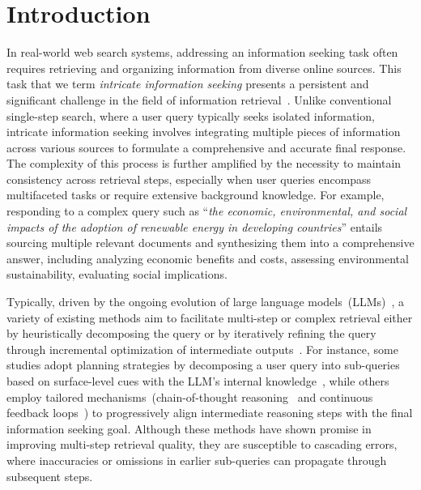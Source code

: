 \section{Introduction}

In real-world web search systems, addressing an information seeking task often requires retrieving and organizing information from diverse online sources. This task that we term \emph{intricate information seeking} presents a persistent and significant challenge in the field of information retrieval~\cite{strohman2005optimization, talmor2018web}. Unlike conventional single-step search, where a user query typically seeks isolated information, intricate information seeking involves integrating multiple pieces of information across various sources to formulate a comprehensive and accurate final response.
The complexity of this process is further amplified by the necessity to maintain consistency across retrieval steps, especially when user queries encompass multifaceted tasks or require extensive background knowledge. For example, responding to a complex query such as ``\emph{the economic, environmental, and social impacts of the adoption of renewable energy in developing countries}'' entails sourcing multiple relevant documents and synthesizing them into a comprehensive answer, including analyzing economic benefits and costs, assessing environmental sustainability, evaluating social implications.

Typically, driven by the ongoing evolution of large language models~(LLMs)~\cite{zhao2023survey}, a variety of existing methods aim to facilitate multi-step or complex retrieval either by heuristically decomposing the query or by iteratively refining the query through incremental optimization of intermediate outputs~\cite{yao2023react, asaiself}. For instance, some studies adopt planning strategies by decomposing a user query into sub-queries based on surface-level cues with the LLM's internal knowledge~\cite{xu2024search, reddy2024infogent}, while others employ tailored mechanisms~(\eg chain-of-thought reasoning~\cite{wei2022chain} and continuous feedback loops~\cite{shinn2024reflexion}) to progressively align intermediate reasoning steps with the final information seeking goal. Although these methods have shown promise in improving multi-step retrieval quality, they are susceptible to cascading errors, where inaccuracies or omissions in earlier sub-queries can propagate through subsequent steps. 

